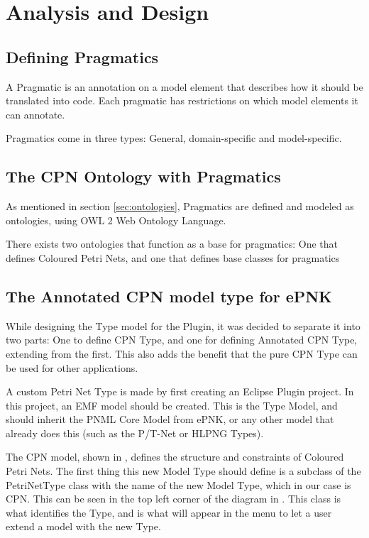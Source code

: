 \chapter{Analysis and Design}
\label{chap:analysis}

\section{Defining Pragmatics}

A Pragmatic is an annotation on a model element that describes how it should be
translated into code. Each pragmatic has restrictions on which model elements it
can annotate.

Pragmatics come in three types: General, domain-specific and model-specific.



\section{The CPN Ontology with Pragmatics}
As mentioned in section \ref{sec:ontologies}, Pragmatics are defined and modeled
as ontologies, using OWL 2 Web Ontology Language.  

There exists two ontologies that function as a base for pragmatics: One that
defines Coloured Petri Nets, and one that defines base classes for pragmatics


\section{The Annotated CPN model type for ePNK}
While designing the Type model for the Plugin, it was decided to separate it
into two parts: One to define CPN Type, and one for defining Annotated CPN Type,
extending from the first. This also adds the benefit that the pure CPN Type can
be used for other applications.

A custom Petri Net Type is made by first creating an Eclipse Plugin project. 
In this project, an EMF model should be created. This is the Type Model, and
should inherit the PNML Core Model from ePNK, or any other model that already
does this (such as the P/T-Net or HLPNG Types). 

The CPN model, shown in , defines the structure and
constraints of Coloured Petri Nets. The first thing this new Model Type should
define is a subclass of the PetriNetType class with the name of the new Model
Type, which in our case is CPN. This can be seen in the top left corner of the
diagram in . This class is what identifies the Type,
and is what will appear in the menu to let a user extend a model with the new
Type.

